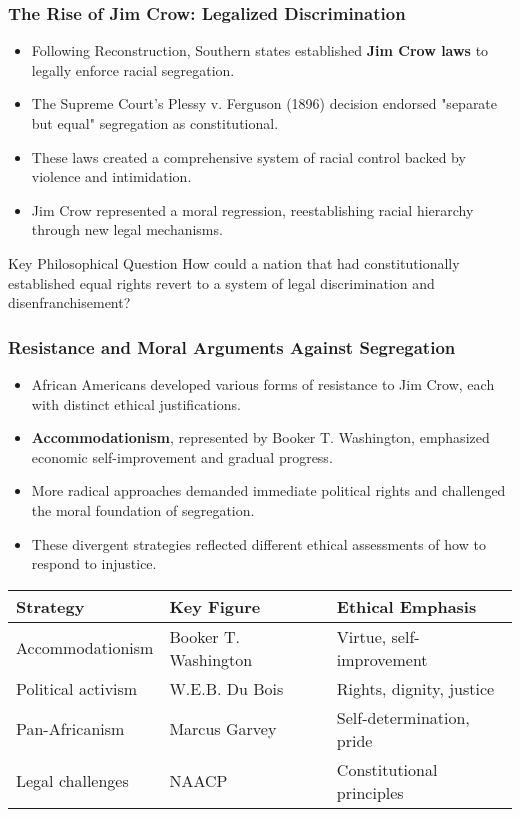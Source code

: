 \documentclass{beamer}
\begin{document}
	\begin{frame}
		\frametitle{The Rise of Jim Crow: Legalized Discrimination}
		
		\begin{itemize}
			\item Following Reconstruction, Southern states established \textbf{Jim Crow laws} to legally enforce racial segregation.
			\item The Supreme Court's Plessy v. Ferguson (1896) decision endorsed "separate but equal" segregation as constitutional.
			\item These laws created a comprehensive system of racial control backed by violence and intimidation.
			\item Jim Crow represented a moral regression, reestablishing racial hierarchy through new legal mechanisms.
		\end{itemize}
		
		\begin{alertblock}{Key Philosophical Question}
			How could a nation that had constitutionally established equal rights revert to a system of legal discrimination and disenfranchisement?
		\end{alertblock}
		
	\end{frame}
	
	\begin{frame}
		\frametitle{Resistance and Moral Arguments Against Segregation}
		
		\begin{itemize}
			\item African Americans developed various forms of resistance to Jim Crow, each with distinct ethical justifications.
			\item \textbf{Accommodationism}, represented by Booker T. Washington, emphasized economic self-improvement and gradual progress.
			\item More radical approaches demanded immediate political rights and challenged the moral foundation of segregation.
			\item These divergent strategies reflected different ethical assessments of how to respond to injustice.
		\end{itemize}
		
		\begin{table}
			\scriptsize
			\begin{tabular}{lll}
				\toprule
				\textbf{Strategy} & \textbf{Key Figure} & \textbf{Ethical Emphasis} \\
				\midrule
				Accommodationism & Booker T. Washington & Virtue, self-improvement \\
				Political activism & W.E.B. Du Bois & Rights, dignity, justice \\
				Pan-Africanism & Marcus Garvey & Self-determination, pride \\
				Legal challenges & NAACP & Constitutional principles \\
				\bottomrule
			\end{tabular}
		\end{table}
		
	\end{frame}
	
\end{document}
